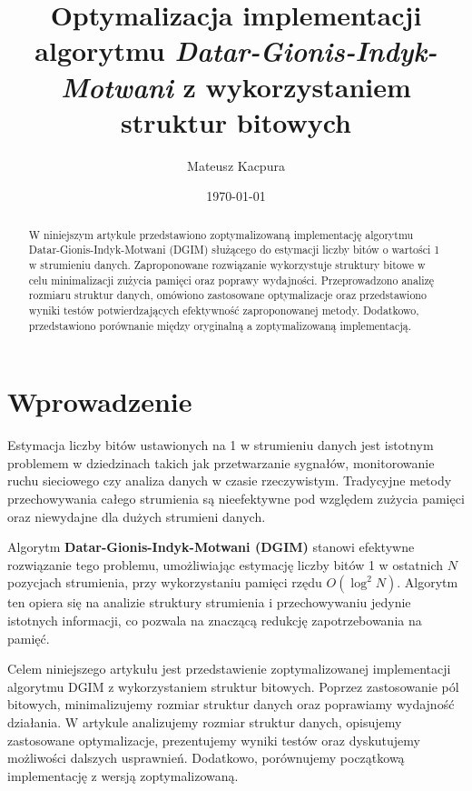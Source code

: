 \documentclass{article}
\begin{document}
\title{Optymalizacja implementacji algorytmu \textit{Datar-Gionis-Indyk-Motwani} z wykorzystaniem struktur bitowych}
\author{Mateusz Kacpura}
\date{\today}

\maketitle

\begin{abstract}
W niniejszym artykule przedstawiono zoptymalizowaną implementację algorytmu Datar-Gionis-Indyk-Motwani (DGIM) służącego do estymacji liczby bitów o wartości 1 w strumieniu danych. Zaproponowane rozwiązanie wykorzystuje struktury bitowe w celu minimalizacji zużycia pamięci oraz poprawy wydajności. Przeprowadzono analizę rozmiaru struktur danych, omówiono zastosowane optymalizacje oraz przedstawiono wyniki testów potwierdzających efektywność zaproponowanej metody. Dodatkowo, przedstawiono porównanie między oryginalną a zoptymalizowaną implementacją.
\end{abstract}

\tableofcontents

\newpage

\section{Wprowadzenie}

Estymacja liczby bitów ustawionych na 1 w strumieniu danych jest istotnym problemem w dziedzinach takich jak przetwarzanie sygnałów, monitorowanie ruchu sieciowego czy analiza danych w czasie rzeczywistym. Tradycyjne metody przechowywania całego strumienia są nieefektywne pod względem zużycia pamięci oraz niewydajne dla dużych strumieni danych.

Algorytm \textbf{Datar-Gionis-Indyk-Motwani (DGIM)} \cite{dgim2002} stanowi efektywne rozwiązanie tego problemu, umożliwiając estymację liczby bitów 1 w ostatnich $N$ pozycjach strumienia, przy wykorzystaniu pamięci rzędu $O(\log^2 N)$. Algorytm ten opiera się na analizie struktury strumienia i przechowywaniu jedynie istotnych informacji, co pozwala na znaczącą redukcję zapotrzebowania na pamięć.

Celem niniejszego artykułu jest przedstawienie zoptymalizowanej implementacji algorytmu DGIM z wykorzystaniem struktur bitowych. Poprzez zastosowanie pól bitowych, minimalizujemy rozmiar struktur danych oraz poprawiamy wydajność działania. W artykule analizujemy rozmiar struktur danych, opisujemy zastosowane optymalizacje, prezentujemy wyniki testów oraz dyskutujemy możliwości dalszych usprawnień. Dodatkowo, porównujemy początkową implementację z wersją zoptymalizowaną.
\end{document}
